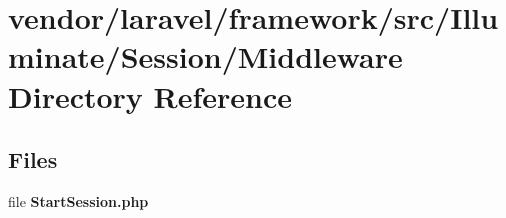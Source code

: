 \section{vendor/laravel/framework/src/\+Illuminate/\+Session/\+Middleware Directory Reference}
\label{dir_b3074fcbd88a839e164f19e9a91177f8}
\subsection*{Files}
\begin{DoxyCompactItemize}
\item 
file {\bf Start\+Session.\+php}
\end{DoxyCompactItemize}
